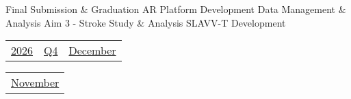 \vfill{\centering{} \small{Final Submission \& Graduation}\hspace{1.5em} \small{AR Platform Development}\hspace{1.5em} \small{Data Management \& Analysis}\hspace{1.5em} \small{Aim 3 - Stroke Study \& Analysis}\hspace{1.5em} \small{SLAVV-T Development}\hspace{1.5em}\par}

\pagebreak
{\noindent\Large\renewcommand{\arraystretch}{\myNumArrayStretch}\begin{tabular}{|l|l|l}
\hyperlink{2026}{2026} & \hyperlink{Q4}{Q4} & \hyperlink{December}{December}
\end{tabular}\hfill%
\begin{tabular}{r@{}}
\hyperlink{month-2026-11}{November}
\end{tabular}}
\myLineThick
